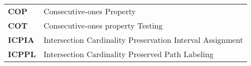 \abbreviations

\begin{tabular}{ll}
  \textbf{COP}& Consecutive-ones Property \\
  \textbf{COT}& Consecutive-ones property Testing \\
  \textbf{ICPIA}& Intersection Cardinality Preservation Interval
  Assignment \\
  \textbf{ICPPL}& Intersection Cardinality Preserved Path Labeling \\ 
\end{tabular}